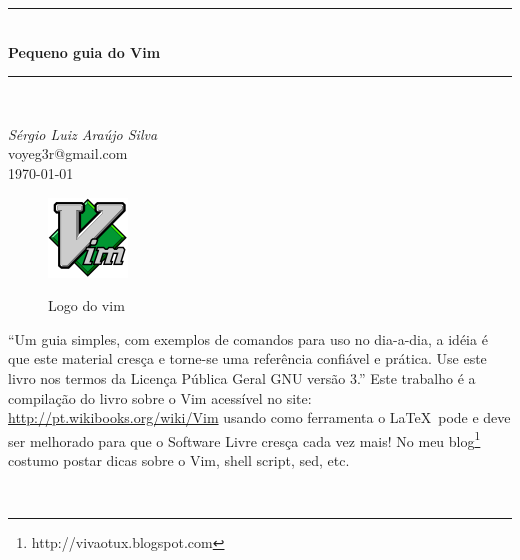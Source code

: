 \documentclass[10pt,a4paper,openany]{book}
\newcommand{\titulo}{Pequeno guia do Vim}
\begin{document}
{}

\begin{titlepage}
 \begin{flushleft}
	\vspace{2mm}
	\vspace{2mm}
	\vspace{2mm}
 \end{flushleft}
	\vspace{2cm}
\begin{center}
	\rule{12cm}{1mm} \\ \vspace{2mm}
	{\LARGE{\bf{\titulo}}} \\
	\vspace{-1mm}
	\rule{12cm}{1mm} \\

               \begin{center}
	{\Large{\em{Sérgio Luiz Araújo Silva}}}\\
		   voyeg3r@gmail.com \\
			\vspace{0.5cm}
       {\Large{\today}}
	        \end{center}

  \begin{figure}[h]
    \center
    \includegraphics{img/vimlogo.png}
    \label{logodovim}
    \caption{Logo do vim}
\end{figure}

	\vspace{3cm}
	\begin{flushright}
	\begin{minipage}[t]{8cm}
	         ``Um guia simples, com exemplos de comandos
			 para uso no dia-a-dia, a idéia é que este
			 material cresça e torne-se uma referência confiável
			 e prática. Use este livro nos termos da Licença Pública Geral GNU versão 3.''
			 Este trabalho é a compilação do livro sobre o Vim acessível no site:
		\url{http://pt.wikibooks.org/wiki/Vim} usando como ferramenta o \LaTeX\,
		pode e deve ser melhorado para
	     que o Software Livre cresça cada vez mais!  No meu
		 blog\footnote{http://vivaotux.blogspot.com} costumo postar dicas sobre
	 o Vim, shell script, sed, etc.
	\end{minipage} \\
	\end{flushright}

	\vspace{1cm}

\end{center}
\end{titlepage}
\end{document}

